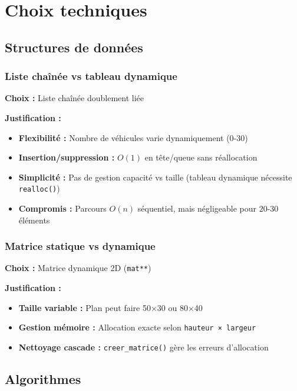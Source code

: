 \documentclass[12pt,a4paper]{article}
\begin{document}

\section{Choix techniques}

\subsection{Structures de données}

\subsubsection{Liste chaînée vs tableau dynamique}

\textbf{Choix :} Liste chaînée doublement liée

\textbf{Justification :}
\begin{itemize}
    \item \textbf{Flexibilité :} Nombre de véhicules varie dynamiquement (0-30)
    \item \textbf{Insertion/suppression :} $O(1)$ en tête/queue sans réallocation
    \item \textbf{Simplicité :} Pas de gestion capacité vs taille (tableau dynamique nécessite \texttt{realloc()})
    \item \textbf{Compromis :} Parcours $O(n)$ séquentiel, mais négligeable pour 20-30 éléments
\end{itemize}

\subsubsection{Matrice statique vs dynamique}

\textbf{Choix :} Matrice dynamique 2D (\texttt{mat**})

\textbf{Justification :}
\begin{itemize}
    \item \textbf{Taille variable :} Plan peut faire 50×30 ou 80×40
    \item \textbf{Gestion mémoire :} Allocation exacte selon \texttt{hauteur × largeur}
    \item \textbf{Nettoyage cascade :} \texttt{creer\_matrice()} gère les erreurs d'allocation
\end{itemize}

\subsection{Algorithmes}
\end{document}
